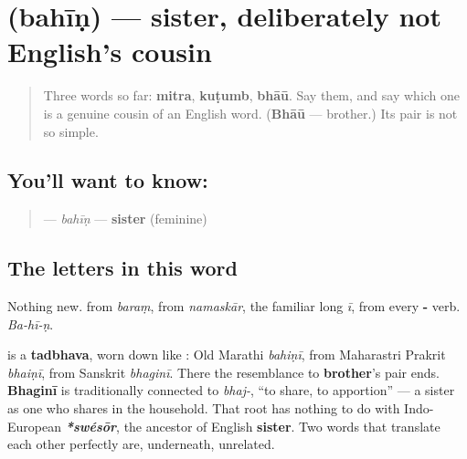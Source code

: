 \section[bahīṇ]{ (bahīṇ) — sister, deliberately not English's cousin}

\label{lesson:MR-C11-bahin}



\begin{quote}
Three words so far: \textbf{mitra}, \textbf{kuṭumb}, \textbf{bhāū}. Say them, and say which one is a genuine cousin of an English word. (\textbf{Bhāū} — brother.) Its pair is not so simple.
\end{quote}

\subsection*{You'll want to know: }
\begin{quote}
\textbf{} — \emph{bahīṇ} — \textbf{sister} (feminine)
\end{quote}

\subsection*{The letters in this word}
Nothing new. \textbf{} from \emph{baraṃ}, \textbf{} from \emph{namaskār}, \textbf{} the familiar long \emph{ī}, \textbf{} from every \textbf{-} verb. \emph{Ba-hī-ṇ}.

\begin{cousinweb}
\textbf{} is a \textbf{tadbhava}, worn down like \textbf{}: Old Marathi \emph{bahiṇī}, from Maharastri Prakrit \emph{bhaiṇī}, from Sanskrit \textbf{} \emph{bhaginī}. There the resemblance to \textbf{brother}'s pair ends. \textbf{Bhaginī} is traditionally connected to \textbf{} \emph{bhaj-}, \textquotedblleft{}to share, to apportion\textquotedblright{} — a sister as one who shares in the household. That root has nothing to do with Indo-European \emph{\textbf{*swésōr}}, the ancestor of English \textbf{sister}. Two words that translate each other perfectly are, underneath, unrelated.
\end{cousinweb}

